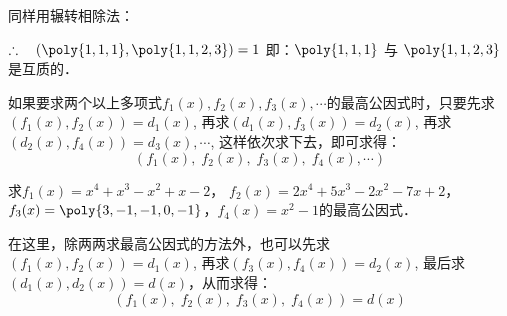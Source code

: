 \begin{solution}
同样用辗转相除法：
\begin{center}

\end{center}

$\therefore\quad (\poly{1,1,1}, \poly{1,1,2,3})=1$
即：$\poly{1,1,1}$ 与 $\poly{1,1,2,3}$ 是互质的．

\end{solution}

如果要求两个以上多项式$f_1(x),f_2(x),f_3(x),\cdots$的最高公因式时，只要先求$(f_1(x),f_2(x))=d_1(x)$, 再求$(d_1(x),f_3(x))=d_2(x)$, 再求$(d_2(x), f_4 (x))=d_3(x),\cdots$, 这样依次求下去，即可求得：
\[(f_1 (x),\; f_2 (x),\; f_3 (x),\; f_4(x),\cdots)\]


\begin{example}
求$f_1(x)=x^4+x^3-x^2+x-2$，
$f_2 (x) =2x^4+5x^3-2x^2-7x+2$，$f_3(x)=\poly{3,-1,-1,0,-1}$，$f_4(x)=x^2-1$的最高公因式．
\end{example}

\begin{note}
在这里，除两两求最高公因式的方法外，也可以先求$(f_1(x),f_2(x))=d_1(x)$, 再求$(f_3(x), f_4(x))=d_2(x)$, 最后求$(d_1(x),d_2(x))=d(x)$，从而求得：
\[(f_1 (x) ,\; f_2 (x),\; f_3 (x),\; f_4 (x)) =d(x)\]
\end{note}

